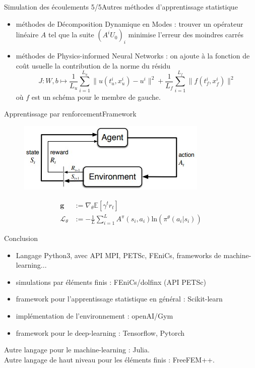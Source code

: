 \documentclass{beamer}
\begin{document}
\begin{frame}{Simulation des écoulements 5/5}{Autres méthodes d'apprentissage statistique}
    \begin{itemize}
        \item méthodes de Décomposition Dynamique en Modes : trouver un opérateur linéaire $A$ tel que la suite $(A^i U_0)_i$ minimise l'erreur des moindres carrés
        
        \item méthodes de Physics-informed Neural Networks : on ajoute à la fonction de coût usuelle la contribution de la norme du résidu
        $$ J : W, b \mapsto \frac{1}{L_u} \sum_{i=1}^{L_u} \| u(t_u^i, x_u^i) - u^i \|^2 + \frac{1}{L_f} \sum_{i=1}^{L_f} \| f(t_f^i, x_f^i) \|^2 $$
        où $f$ est un schéma pour le membre de gauche.
    \end{itemize}
\end{frame}

\begin{frame}{Apprentissage par renforcement}{Framework}
    \begin{figure}
    \includegraphics[]{images/framework_reinforcement_learning.jpg}
    \end{figure}
    \begin{align*}
        \mathbf{g} & := \nabla_\theta \mathbb{E} \left[ \gamma^t r_t \right] \\
        \mathcal{L}_\theta & := -\frac{1}{L} \sum_{i=1}^{L} A^\pi(s_i, a_i) \text{ln}( \pi^\theta(a_i|s_i) )
    \end{align*}
\end{frame}

\begin{frame}{Conclusion}
    \begin{itemize}
    \setlength\itemsep{1.15em}
        \item Langage Python3, avec API MPI, PETSc, FEniCs, frameworks de machine-learning...
        \item simulations par éléments finis : FEniCs/dolfinx (API PETSc)
        \item framework pour l'apprentissage statistique en général : Scikit-learn
        \item implémentation de l'environnement : openAI/Gym
        \item framework pour le deep-learning : Tensorflow, Pytorch
    \end{itemize}
    \vspace{15pt}
    Autre langage pour le machine-learning : Julia. \\
    \vspace{15pt}
    Autre langage de haut niveau pour les éléments finis : FreeFEM++.
\end{frame}
\end{document}
